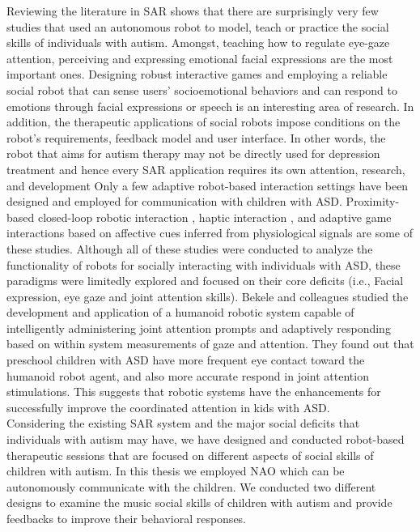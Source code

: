 Reviewing the literature in SAR \cite{DefineSocial2005, SocialInteract2003} shows that there are surprisingly very few
studies that used an autonomous robot to model, teach or practice the social skills of
individuals with autism. Amongst, teaching how to regulate eye-gaze attention, perceiving
and expressing emotional facial expressions are the most important ones. Designing robust
interactive games and employing a reliable social robot that can sense users’ socioemotional
behaviors and can respond to emotions through facial expressions or speech is
an interesting area of research. In addition, the therapeutic applications of social robots
impose conditions on the robot’s requirements, feedback model and user interface. In other
words, the robot that aims for autism therapy may not be directly used for depression
treatment and hence every SAR application requires its own attention, research, and
development
Only a few adaptive robot-based interaction settings have been designed and
employed for communication with children with ASD. Proximity-based closed-loop
robotic interaction \cite{LookApproach1972}, haptic interaction \cite{DiffEffect1966}, and adaptive game interactions based on
affective cues inferred from physiological signals \cite{SysObserv1968} are some of these studies. Although
all of these studies were conducted to analyze the functionality of robots for socially interacting with individuals 
with ASD, these paradigms were limitedly explored and
focused on their core deficits (i.e., Facial expression, eye gaze and joint attention skills).
Bekele and colleagues \cite{AutisticDist1943} studied the development and application of a humanoid
robotic system capable of intelligently administering joint attention prompts and adaptively
responding based on within system measurements of gaze and attention. They found out
that preschool children with ASD have more frequent eye contact toward the humanoid
robot agent, and also more accurate respond in joint attention stimulations. This suggests
that robotic systems have the enhancements for successfully improve the coordinated
attention in kids with ASD.\\

Considering the existing SAR system and the major social deficits that individuals
with autism may have, we have designed and conducted robot-based therapeutic sessions
that are focused on different aspects of social skills of children with autism. In this thesis
we employed NAO which can be autonomously communicate with the children.
We conducted two different designs to examine the music social skills of children with autism
and provide feedbacks to improve their behavioral responses. \\

